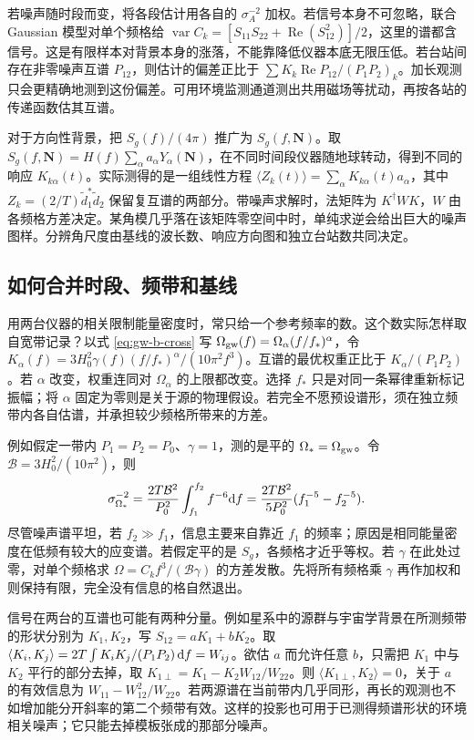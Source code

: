若噪声随时段而变，将各段估计用各自的 $\sigma_A^{-2}$ 加权。若信号本身不可忽略，联合 Gaussian 模型对单个频格给 $\operatorname{var} C_k=[S_{11}S_{22}+\operatorname{Re}(S_{12}^2)]/2$，这里的谱都含信号。这是有限样本对背景本身的涨落，不能靠降低仪器本底无限压低。若台站间存在非零噪声互谱 $P_{12}$，则估计的偏差正比于 $\sum K_k\operatorname{Re}P_{12}/(P_1P_2)_k$。加长观测只会更精确地测到这份偏差。可用环境监测通道测出共用磁场等扰动，再按各站的传递函数估其互谱。

对于方向性背景，把 $S_g(f)/(4\pi)$ 推广为 $S_g(f,\bm N)$。取 $S_g(f,\bm N)=H(f)\sum_\alpha a_\alpha Y_\alpha(\bm N)$，在不同时间段仪器随地球转动，得到不同的响应 $K_{k\alpha}(t)$。实际测得的是一组线性方程 $\langle Z_k(t)\rangle=\sum_\alpha K_{k\alpha}(t)a_\alpha$，其中 $Z_k=(2/T)\tilde d_1^*\tilde d_2$ 保留复互谱的两部分。带噪声求解时，法矩阵为 $K^\dagger W K$，$W$ 由各频格方差决定。某角模几乎落在该矩阵零空间中时，单纯求逆会给出巨大的噪声图样。分辨角尺度由基线的波长数、响应方向图和独立台站数共同决定。

\subsection{如何合并时段、频带和基线}
用两台仪器的相关限制能量密度时，常只给一个参考频率的数。这个数实际怎样取自宽带记录？以式 \eqref{eq:gw-b-cross} 写 $\Omega_{\rm gw}(f)=\Omega_\alpha(f/f_*)^\alpha$，令 $K_\alpha(f)=3H_0^2\gamma(f)(f/f_*)^\alpha/(10\pi^2f^3)$。互谱的最优权重正比于 $K_\alpha/(P_1P_2)$。若 $\alpha$ 改变，权重连同对 $\Omega_\alpha$ 的上限都改变。选择 $f_*$ 只是对同一条幂律重新标记振幅；将 $\alpha$ 固定为零则是关于源的物理假设。若完全不愿预设谱形，须在独立频带内各自估谱，并承担较少频格所带来的方差。

例如假定一带内 $P_1=P_2=P_0$、$\gamma=1$，测的是平的 $\Omega_*=\Omega_{\rm gw}$。令 $\mathcal B=3H_0^2/(10\pi^2)$，则
\[
 \sigma_{\Omega_*}^{-2}
 =\frac{2T\mathcal B^2}{P_0^2}
 \int_{f_1}^{f_2}f^{-6}\dd f
 =\frac{2T\mathcal B^2}{5P_0^2}(f_1^{-5}-f_2^{-5}) .
\]
尽管噪声谱平坦，若 $f_2\gg f_1$，信息主要来自靠近 $f_1$ 的频率；原因是相同能量密度在低频有较大的应变谱。若假定平的是 $S_g$，各频格才近乎等权。若 $\gamma$ 在此处过零，对单个频格求 $\Omega=C_k f^3/(\mathcal B\gamma)$ 的方差发散。先将所有频格乘 $\gamma$ 再作加权和则保持有限，完全没有信息的格自然退出。

信号在两台的互谱也可能有两种分量。例如星系中的源群与宇宙学背景在所测频带的形状分别为 $K_1,K_2$，写 $S_{12}=aK_1+bK_2$。取 $\langle K_i,K_j\rangle=2T\int K_iK_j/(P_1P_2)\,\dd f=W_{ij}$。欲估 $a$ 而允许任意 $b$，只需把 $K_1$ 中与 $K_2$ 平行的部分去掉，取 $K_{1\perp}=K_1-K_2 W_{12}/W_{22}$。则 $\langle K_{1\perp},K_2\rangle=0$，关于 $a$ 的有效信息为 $W_{11}-W_{12}^2/W_{22}$。若两源谱在当前带内几乎同形，再长的观测也不如增加能分开斜率的第二个频带有效。这样的投影也可用于已测得频谱形状的环境相关噪声；它只能去掉模板张成的那部分噪声。

